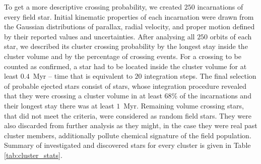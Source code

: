 To get a more descriptive crossing probability, we created $250$ incarnations of every field star. Initial kinematic properties of each incarnation were drawn from the Gaussian distributions of parallax, radial velocity, and proper motion defined by their reported values and uncertainties. After analysing all $250$ orbits of each star, we described its cluster crossing probability by the longest stay inside the cluster volume and  by the percentage of crossing events. For a crossing to be counted as confirmed, a star had to be located inside the cluster volume for at least $0.4$~Myr -- time that is equivalent to $20$ integration steps. The final selection of probable ejected stars consist of stars, whose integration procedure revealed that they were crossing a cluster volume in at least $68$\% of the incarnations and their longest stay there was at least $1$~Myr. Remaining volume crossing stars, that did not meet the criteria, were considered as random field stars. They were also discarded from further analysis as they might, in the case they were real past cluster members, additionally pollute chemical signature of the field population. Summary of investigated and discovered stars for every cluster is given in Table \ref{tab:cluster_stats}.

